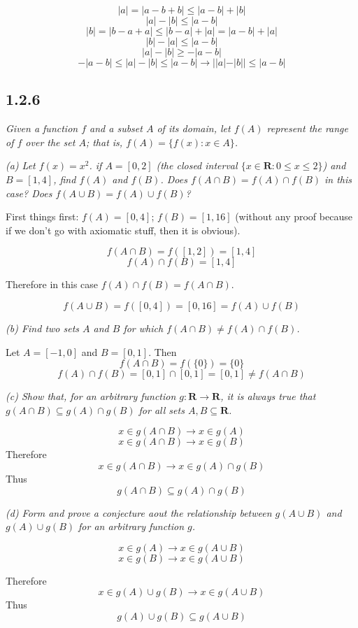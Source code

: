 \documentclass[11pt,oneside,titlepage]{book}
\begin{document}
$$|a| = |a - b + b| \leq |a - b| + |b|$$
$$|a| - |b| \leq |a - b|$$
$$|b| = |b - a + a| \leq |b - a| + |a| = |a - b| + |a|$$
$$|b| - |a| \leq |a - b|$$
$$|a| - |b| \geq -|a - b|$$
$$-|a - b| \leq |a| - |b| \leq |a - b| \to ||a| - |b|| \leq |a - b|$$

\subsection*{1.2.6}
\textit{Given a function $f$ and a subset $A$ of its domain, let $f(A)$
  represent the range of $f$ over the set $A$; that is,
  $f(A) = \{f(x): x \in A\}$. }

\textit{(a) Let $f(x) = x^2$. if $A=[0,2]$ (the closed interval $\{x \in
  \textbf{R}: 0 \leq x \leq 2\}$) and $B=[1,4]$, find $f(A)$ and $f(B)$. Does
  $f (A \cap B) = f(A) \cap f(B)$ in this case? Does $f(A \cup B) = f(A) \cup
  f(B)$? }

First things first: $f(A) = [0, 4]$; $f(B) = [1, 16]$ (without any proof
because if we don't go with axiomatic stuff, then it is obvious).

$$f(A \cap B) = f([1, 2]) = [1, 4]$$
$$f(A) \cap f(B) = [1, 4]$$

Therefore in this case $f(A) \cap f(B) = f(A \cap B)$.

$$f(A \cup B) = f([0, 4]) = [0, 16] = f(A) \cup f(B)$$

\textit{(b) Find two sets $A$ and $B$ for which $f(A \cap B) \neq f(A) \cap f(B)$.}

Let $A = [-1, 0]$ and $B = [0, 1]$. Then
$$f(A \cap B) = f(\{0\}) = \{0\}$$
$$f(A) \cap f(B) = [0, 1] \cap [0, 1] = [0, 1] \neq f(A \cap B)$$

\textit{(c) Show that, for an arbitrary function $g: \textbf{R} \to \textbf{R}$, it
  is always true that $g(A \cap B) \subseteq g(A) \cap g(B)$ for all sets
  $A,B \subseteq \textbf{R}$.}

$$x \in g(A \cap B) \to x \in g(A)$$
$$x \in g(A \cap B) \to x \in g(B)$$
Therefore
$$x \in g(A \cap B) \to x \in g(A) \cap g(B)$$
Thus
$$g(A \cap B) \subseteq g(A) \cap g(B)$$

\textit{(d) Form and prove a conjecture aout the relationship between
  $g(A \cup B)$ and $g(A) \cup g(B)$ for an arbitrary function $g$.}

$$x \in g(A) \to x \in g(A \cup B)$$
$$x \in g(B) \to x \in g(A \cup B)$$

Therefore
$$x \in g(A) \cup g(B) \to x \in g(A \cup B)$$
Thus
$$g(A) \cup g(B) \subseteq g(A \cup B)$$
\end{document}
